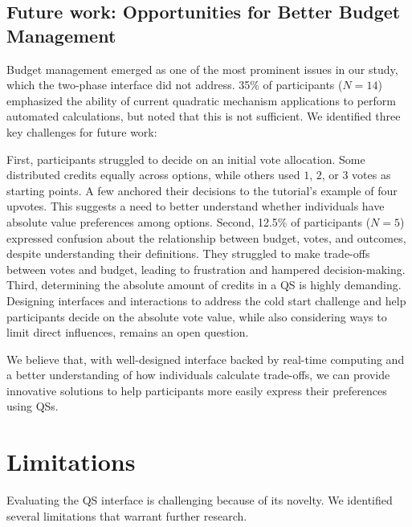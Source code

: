 \subsection{Future work: Opportunities for Better Budget Management}
Budget management emerged as one of the most prominent issues in our study, which the two-phase interface did not address. 35\% of participants ($N=14$) emphasized the ability of current quadratic mechanism applications to perform automated calculations, but noted that this is not sufficient.  We identified three key challenges for future work:

First, participants struggled to decide on an initial vote allocation. Some distributed credits equally across options, while others used $1$, $2$, or $3$ votes as starting points. A few anchored their decisions to the tutorial's example of four upvotes. This suggests a need to better understand whether individuals have absolute value preferences among options. Second, 12.5\% of participants ($N=5$) expressed confusion about the relationship between budget, votes, and outcomes, despite understanding their definitions. They struggled to make trade-offs between votes and budget, leading to frustration and hampered decision-making. Third, determining the absolute amount of credits in a QS is highly demanding. Designing interfaces and interactions to address the cold start challenge and help participants decide on the absolute vote value, while also considering ways to limit direct influences, remains an open question.

We believe that, with well-designed interface backed by real-time computing and a better understanding of how individuals calculate trade-offs, we can provide innovative solutions to help participants more easily express their preferences using QSs.

\section{Limitations}
\label{sec:limitations}
Evaluating the QS interface is challenging because of its novelty. We identified several limitations that warrant further research.


